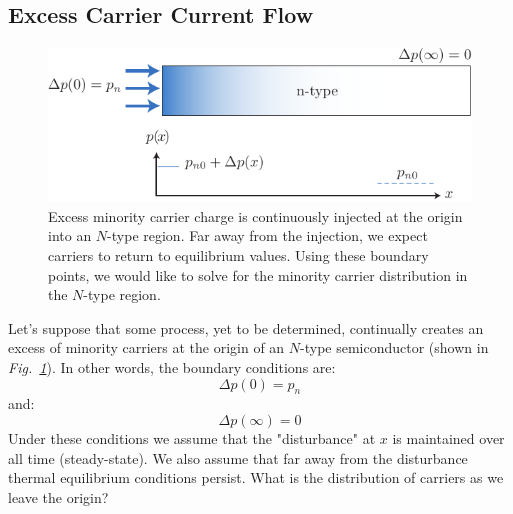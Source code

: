 \subsection{Excess Carrier Current Flow}
\begin{figure}[tb]
\centering
\includegraphics[width=.75\columnwidth]{excess_charge_inject}
\caption{Excess minority carrier charge is continuously injected at the origin into an $N$-type region.  Far away from the injection, we expect carriers to return to equilibrium values.  Using these boundary points, we would like to solve for the minority carrier distribution in the $N$-type region.} \label{fig:excess_charge_inject}
\end{figure}
Let's suppose that some process, yet to be determined, continually creates an excess of minority carriers at the origin of an $N$-type semiconductor (shown in \emph{Fig.~\ref{fig:excess_charge_inject}}).  In other words, the boundary conditions are:
    \begin{equation}
        \Delta p(0) = p_n
    \end{equation}	
and:
    \begin{equation}
        \Delta p(\infty) = 0
    \end{equation}	
Under these conditions we assume that the "disturbance" at $x$ is maintained over all time (steady-state).  We also assume that far away from the disturbance thermal equilibrium conditions persist.  What is the distribution of carriers as we leave the origin?  
